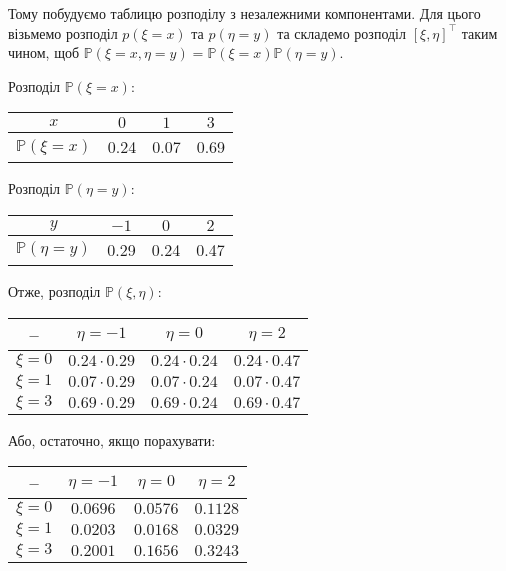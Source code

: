 \documentclass[14pt]{extarticle}
\begin{document}
Тому побудуємо таблицю розподілу з незалежними компонентами. Для цього візьмемо розподіл $p(\xi=x)$ та $p(\eta=y)$ та складемо розподіл $[\xi,\eta]^{\top}$ таким чином, щоб $\mathbb{P}(\xi=x,\eta=y)=\mathbb{P}(\xi=x)\mathbb{P}(\eta=y)$. 

Розподіл $\mathbb{P}(\xi=x)$:
\begin{center}
\begin{tabular}{ |c|c|c|c| } 
 \hline
 $x$ & $0$ & $1$ & $3$ \\ 
 \hline
 $\mathbb{P}(\xi=x)$ & 0.24 & 0.07 & 0.69 \\ 
 \hline
\end{tabular}
\end{center}

Розподіл $\mathbb{P}(\eta=y)$:
\begin{center}
\begin{tabular}{ |c|c|c|c| } 
 \hline
 $y$ & $-1$ & $0$ & $2$ \\ 
 \hline
 $\mathbb{P}(\eta=y)$ & 0.29 & 0.24 & 0.47 \\ 
 \hline
\end{tabular}
\end{center}

Отже, розподіл $\mathbb{P}(\xi,\eta)$:
\begin{center}
\begin{tabular}{ |c|c|c|c| } 
 \hline
 -- & $\eta=-1$ & $\eta=0$ & $\eta=2$ \\ 
 \hline
 $\xi=0$ & $0.24 \cdot 0.29$ & $0.24 \cdot 0.24$ & $0.24 \cdot 0.47$ \\ 
 \hline
 $\xi=1$ & $0.07 \cdot 0.29$ & $0.07 \cdot 0.24$ & $0.07 \cdot 0.47$ \\ 
 \hline
 $\xi=3$ & $0.69 \cdot 0.29$ & $0.69 \cdot 0.24$ & $0.69 \cdot 0.47$ \\
 \hline
\end{tabular}
\end{center}
Або, остаточно, якщо порахувати:
\begin{center}
\begin{tabular}{ |c|c|c|c| } 
 \hline
 -- & $\eta=-1$ & $\eta=0$ & $\eta=2$ \\ 
 \hline
 $\xi=0$ & $0.0696$ & $0.0576$ & $0.1128$ \\ 
 \hline
 $\xi=1$ & $0.0203$ & $0.0168$ & $0.0329$ \\ 
 \hline
 $\xi=3$ & $0.2001$ & $0.1656$ & $0.3243$ \\
 \hline
\end{tabular}
\end{center}
\end{document}
